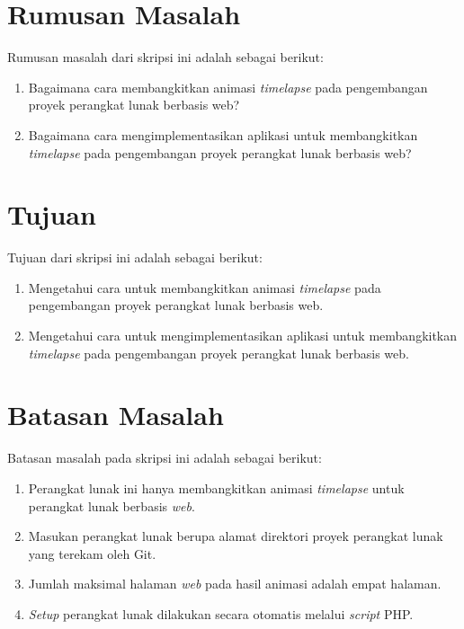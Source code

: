 \section{Rumusan Masalah}
\label{sec:rumusan}
Rumusan masalah dari skripsi ini adalah sebagai berikut:
\begin{enumerate}
	\item Bagaimana cara membangkitkan animasi \textit{timelapse} pada pengembangan proyek perangkat lunak berbasis web?
	\item Bagaimana cara mengimplementasikan aplikasi untuk membangkitkan \textit{timelapse} pada pengembangan proyek perangkat lunak berbasis web?
\end{enumerate}

\section{Tujuan}
\label{sec:tujuan}
Tujuan dari skripsi ini adalah sebagai berikut:
\begin{enumerate}
	\item Mengetahui cara untuk membangkitkan animasi \textit{timelapse} pada pengembangan proyek perangkat lunak berbasis web.
	\item Mengetahui cara untuk mengimplementasikan aplikasi untuk membangkitkan \textit{timelapse} pada pengembangan proyek perangkat lunak berbasis web.
\end{enumerate}

\section{Batasan Masalah}
\label{sec:batasan}
Batasan masalah pada skripsi ini adalah sebagai berikut:
\begin{enumerate}
		\item Perangkat lunak ini hanya membangkitkan animasi \textit{timelapse} untuk perangkat lunak berbasis \textit{web}. 
		\item Masukan perangkat lunak berupa alamat direktori proyek perangkat lunak yang terekam oleh Git.
	
	    \item Jumlah maksimal halaman \textit{web} pada hasil animasi adalah empat halaman.
	    \item \textit{Setup} perangkat lunak dilakukan secara otomatis melalui \textit{script} PHP.
\end{enumerate}
